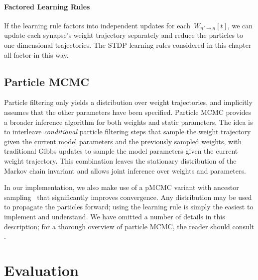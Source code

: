 \paragraph{Factored Learning Rules}
If the learning rule factors into
independent updates for each~$W_{n' \to n}[t]$, we can update
each synapse's weight trajectory separately and reduce the particles
to one-dimensional trajectories. The STDP learning rules considered 
in this chapter all factor in this way. 


\subsection{Particle MCMC}
Particle filtering only yields a distribution over weight
trajectories, and implicitly assumes that the other parameters have
been specified. Particle MCMC provides a broader inference algorithm
for both weights and static parameters. The idea is to interleave
\emph{conditional} particle filtering steps that sample the weight
trajectory given the current model parameters and the previously
sampled weights, with traditional Gibbs updates to sample the model
parameters given the current weight trajectory. This combination
leaves the stationary distribution of the Markov chain invariant and
allows joint inference over weights and parameters.  

In our implementation, we also make use of
a pMCMC variant with ancestor sampling~\cite{Lindsten-2012} that
significantly improves convergence. Any distribution may be used to
propagate the particles forward; using the learning rule is simply the
easiest to implement and understand.  We have omitted a number of
details in this description; for a thorough overview of particle MCMC,
the reader should consult \cite{Andrieu-2010, Lindsten-2012}.



\section{Evaluation}

